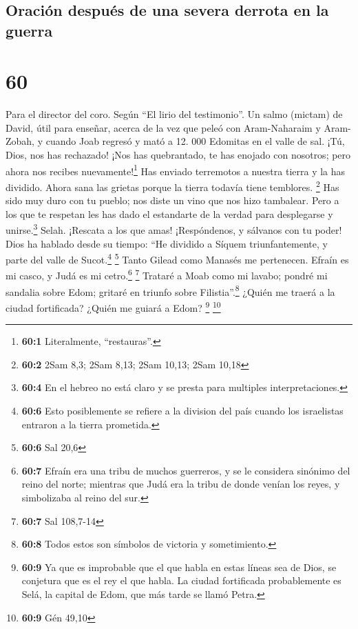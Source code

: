 \hypertarget{oraciuxf3n-despuuxe9s-de-una-severa-derrota-en-la-guerra}{%
\subsection{Oración después de una severa derrota en la
guerra}\label{oraciuxf3n-despuuxe9s-de-una-severa-derrota-en-la-guerra}}

\hypertarget{section-59}{%
\section{60}\label{section-59}}

Para el director del coro. Según ``El lirio del testimonio''. Un salmo
(mictam) de David, útil para enseñar, acerca de la vez que peleó con
Aram-Naharaim y Aram-Zobah, y cuando Joab regresó y mató a 12. 000
Edomitas en el valle de sal.  ¡Tú, Dios, nos has
rechazado! ¡Nos has quebrantado, te has enojado con nosotros; pero ahora
nos recibes nuevamente!\footnote{\textbf{60:1} Literalmente,
  ``restauras''.}  Has enviado terremotos a nuestra tierra
y la has dividido. Ahora sana las grietas porque la tierra todavía tiene
temblores. \footnote{\textbf{60:2} 2Sam 8,3; 2Sam 8,13; 2Sam 10,13; 2Sam
  10,18}  Has sido muy duro con tu pueblo; nos diste un
vino que nos hizo tambalear.  Pero a los que te respetan
les has dado el estandarte de la verdad para desplegarse y
unirse.\footnote{\textbf{60:4} En el hebreo no está claro y se presta
  para multiples interpretaciones.} Selah. ¡Rescata a los que amas!
 ¡Respóndenos, y sálvanos con tu poder! 
Dios ha hablado desde su tiempo: ``He dividido a Síquem triunfantemente,
y parte del valle de Sucot.\footnote{\textbf{60:6} Esto posiblemente se
  refiere a la division del país cuando los israelistas entraron a la
  tierra prometida.} \footnote{\textbf{60:6} Sal 20,6} 
Tanto Gilead como Manasés me pertenecen. Efraín es mi casco, y Judá es
mi cetro.\footnote{\textbf{60:7} Efraín era una tribu de muchos
  guerreros, y se le considera sinónimo del reino del norte; mientras
  que Judá era la tribu de donde venían los reyes, y simbolizaba al
  reino del sur.} \footnote{\textbf{60:7} Sal 108,7-14} 
Trataré a Moab como mi lavabo; pondré mi sandalia sobre Edom; gritaré en
triunfo sobre Filistia''.\footnote{\textbf{60:8} Todos estos son
  símbolos de victoria y sometimiento.}  ¿Quién me traerá
a la ciudad fortificada? ¿Quién me guiará a Edom? \footnote{\textbf{60:9}
  Ya que es improbable que el que habla en estas líneas sea de Dios, se
  conjetura que es el rey el que habla. La ciudad fortificada
  probablemente es Selá, la capital de Edom, que más tarde se llamó
  Petra.} \footnote{\textbf{60:9} Gén 49,10}

